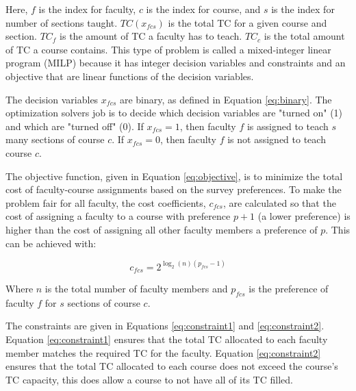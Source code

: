 \documentclass{article}
\begin{document}
    Here, $f$ is the index for faculty, $c$ is the index for course, and $s$ is the index for number of sections taught.
    $TC(x_{fcs})$ is the total TC for a given course and section.
    $TC_f$ is the amount of TC a faculty has to teach.
    $TC_c$ is the total amount of TC a course contains.
    This type of problem is called a mixed-integer linear program (MILP) because it has integer decision variables and constraints
     and an objective that are linear functions of the decision variables.

    The decision variables $x_{fcs}$ are binary, as defined in Equation \eqref{eq:binary}.
    The optimization solvers job is to decide which decision variables are "turned on" (1) and which are "turned off" (0).
    If $x_{fcs} = 1$, then faculty $f$ is assigned to teach $s$ many sections of course $c$.
    If $x_{fcs} = 0$, then faculty $f$ is not assigned to teach course $c$.

    The objective function, given in Equation \eqref{eq:objective}, is to minimize the total cost of faculty-course assignments based on the survey preferences.
    To make the problem fair for all faculty, the cost coefficients, $c_{fcs}$, are calculated so that the cost of assigning
    a faculty to a course with preference $p + 1$ (a lower preference) is higher than the cost of assigning all other faculty members
    a preference of $p$. This can be achieved with:

    \begin{equation}
        c_{fcs} = 2^{\log_2(n)(p_{fcs}-1)}
        \label{eq:cost}
    \end{equation}

    Where $n$ is the total number of faculty members and $p_{fcs}$ is the preference of faculty $f$ for $s$ sections of course $c$.

    The constraints are given in Equations \eqref{eq:constraint1} and \eqref{eq:constraint2}.
    Equation \eqref{eq:constraint1} ensures that the total TC allocated to each faculty member matches the required TC for the faculty.
    Equation \eqref{eq:constraint2} ensures that the total TC allocated to each course does not exceed the course's TC capacity, this does allow a course to not have all of its TC filled.
\end{document}
